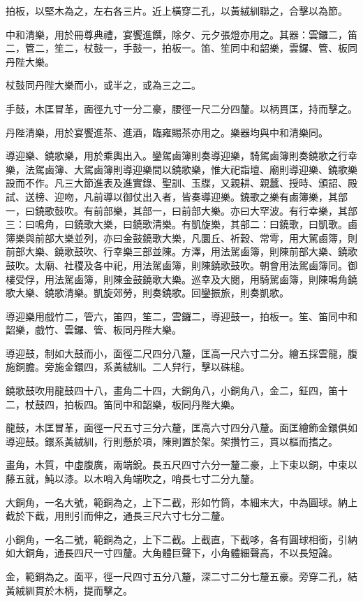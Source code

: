 \begin{pinyinscope}
拍板，以堅木為之，左右各三片。近上橫穿二孔，以黃絨紃聯之，合擊以為節。

中和清樂，用於冊尊典禮，宴饗進饌，除夕、元夕張燈亦用之。其器：雲鑼二，笛二，管二，笙二，杖鼓一，手鼓一，拍板一。笛、笙同中和韶樂，雲鑼、管、板同丹陛大樂。

杖鼓同丹陛大樂而小，或半之，或為三之二。

手鼓，木匡冒革，面徑九寸一分二豪，腰徑一尺二分四釐。以柄貫匡，持而擊之。

丹陛清樂，用於宴饗進茶、進酒，臨雍賜茶亦用之。樂器均與中和清樂同。

導迎樂、鐃歌樂，用於乘輿出入。鑾駕鹵簿則奏導迎樂，騎駕鹵簿則奏鐃歌之行幸樂，法駕鹵簿、大駕鹵簿則導迎樂間以鐃歌樂，惟大祀詣壇、廟則導迎樂、鐃歌樂設而不作。凡三大節進表及進實錄、聖訓、玉牒，又親耕、親蠶、授時、頒詔、殿試、送榜、迎吻，凡前導以御仗出入者，皆奏導迎樂。鐃歌之樂有鹵簿樂，其部一，曰鐃歌鼓吹。有前部樂，其部一，曰前部大樂。亦曰大罕波。有行幸樂，其部三：曰鳴角，曰鐃歌大樂，曰鐃歌清樂。有凱旋樂，其部二：曰鐃歌，曰凱歌。鹵簿樂與前部大樂並列，亦曰金鼓鐃歌大樂，凡圜丘、祈穀、常雩，用大駕鹵簿，則前部大樂、鐃歌鼓吹、行幸樂三部並陳。方澤，用法駕鹵簿，則陳前部大樂、鐃歌鼓吹。太廟、社稷及各中祀，用法駕鹵簿，則陳鐃歌鼓吹。朝會用法駕鹵簿同。御樓受俘，用法駕鹵簿，則陳金鼓鐃歌大樂。巡幸及大閱，用騎駕鹵簿，則陳鳴角鐃歌大樂、鐃歌清樂。凱旋郊勞，則奏鐃歌。回鑾振旅，則奏凱歌。

導迎樂用戲竹二，管六，笛四，笙二，雲鑼二，導迎鼓一，拍板一。笙、笛同中和韶樂，戲竹、雲鑼、管、板同丹陛大樂。

導迎鼓，制如大鼓而小，面徑二尺四分八釐，匡高一尺六寸二分。繪五採雲龍，腹施銅膽。旁施金鐶四，系黃絨紃。二人舁行，擊以硃槌。

鐃歌鼓吹用龍鼓四十八，畫角二十四，大銅角八，小銅角八，金二，鉦四，笛十二，杖鼓四，拍板四。笛同中和韶樂，板同丹陛大樂。

龍鼓，木匡冒革，面徑一尺五寸三分六釐，匡高六寸四分八釐。面匡繪飾金鐶俱如導迎鼓。鐶系黃絨紃，行則懸於項，陳則置於架。架攢竹三，貫以樞而搘之。

畫角，木質，中虛腹廣，兩端銳。長五尺四寸六分一釐二豪，上下束以銅，中束以藤五就，魨以漆。以木哨入角端吹之，哨長七寸二分九釐。

大銅角，一名大號，範銅為之，上下二截，形如竹筒，本細末大，中為圓球。納上截於下截，用則引而伸之，通長三尺六寸七分二釐。

小銅角，一名二號，範銅為之，上下二截。上截直，下截哆，各有圓球相銜，引納如大銅角，通長四尺一寸四釐。大角體巨聲下，小角體細聲高，不以長短論。

金，範銅為之。面平，徑一尺四寸五分八釐，深二寸二分七釐五豪。旁穿二孔，結黃絨紃貫於木柄，提而擊之。


\end{pinyinscope}
